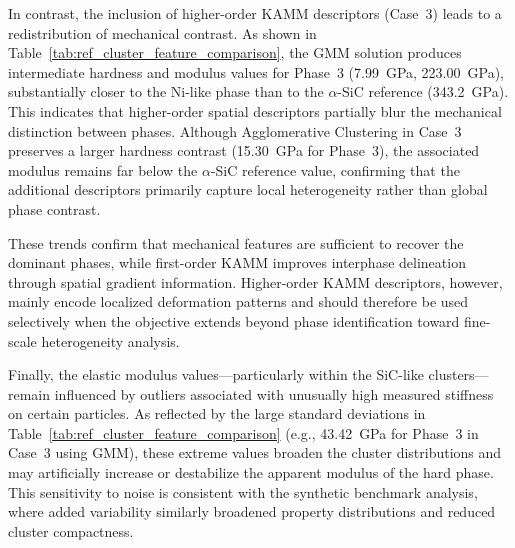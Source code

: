 \documentclass[final,3p,times]{elsarticle}
\begin{document}
In contrast, the inclusion of higher-order KAMM descriptors (Case~3) leads to a redistribution of mechanical contrast. As shown in Table~\ref{tab:ref_cluster_feature_comparison}, the GMM solution produces intermediate hardness and modulus values for Phase~3 (7.99~GPa, 223.00~GPa), substantially closer to the Ni-like phase than to the $\alpha$-SiC reference (343.2~GPa). This indicates that higher-order spatial descriptors partially blur the mechanical distinction between phases. Although Agglomerative Clustering in Case~3 preserves a larger hardness contrast (15.30~GPa for Phase~3), the associated modulus remains far below the $\alpha$-SiC reference value, confirming that the additional descriptors primarily capture local heterogeneity rather than global phase contrast.

These trends confirm that mechanical features are sufficient to recover the dominant phases, while first-order KAMM improves interphase delineation through spatial gradient information. Higher-order KAMM descriptors, however, mainly encode localized deformation patterns and should therefore be used selectively when the objective extends beyond phase identification toward fine-scale heterogeneity analysis.

Finally, the elastic modulus values—particularly within the SiC-like clusters—remain influenced by outliers associated with unusually high measured stiffness on certain particles. As reflected by the large standard deviations in Table~\ref{tab:ref_cluster_feature_comparison} (e.g., 43.42~GPa for Phase~3 in Case~3 using GMM), these extreme values broaden the cluster distributions and may artificially increase or destabilize the apparent modulus of the hard phase. This sensitivity to noise is consistent with the synthetic benchmark analysis, where added variability similarly broadened property distributions and reduced cluster compactness.
\end{document}
